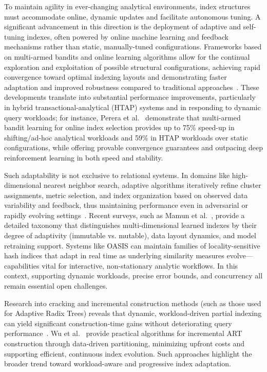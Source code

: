 \documentclass[sigconf]{acmart}
\begin{document}
To maintain agility in ever-changing analytical environments, index structures must accommodate online, dynamic updates and facilitate autonomous tuning. A significant advancement in this direction is the deployment of adaptive and self-tuning indexes, often powered by online machine learning and feedback mechanisms rather than static, manually-tuned configurations. Frameworks based on multi-armed bandits and online learning algorithms allow for the continual exploration and exploitation of possible structural configurations, achieving rapid convergence toward optimal indexing layouts and demonstrating faster adaptation and improved robustness compared to traditional approaches~\cite{ref79,ref80,ref105}. These developments translate into substantial performance improvements, particularly in hybrid transactional-analytical (HTAP) systems and in responding to dynamic query workloads; for instance, Perera et al.~\cite{ref105} demonstrate that multi-armed bandit learning for online index selection provides up to 75\% speed-up in shifting/ad-hoc analytical workloads and 59\% in HTAP workloads over static configurations, while offering provable convergence guarantees and outpacing deep reinforcement learning in both speed and stability.

Such adaptability is not exclusive to relational systems. In domains like high-dimensional nearest neighbor search, adaptive algorithms iteratively refine cluster assignments, metric selection, and index organization based on observed data variability and feedback, thus maintaining performance even in adversarial or rapidly evolving settings~\cite{ref110}. Recent surveys, such as Mamun et al.~\cite{ref110}, provide a detailed taxonomy that distinguishes multi-dimensional learned indexes by their degree of adaptivity (immutable vs. mutable), data layout dynamics, and model retraining support. Systems like OASIS can maintain families of locality-sensitive hash indices that adapt in real time as underlying similarity measures evolve---capabilities vital for interactive, non-stationary analytic workflows. In this context, supporting dynamic workloads, precise error bounds, and concurrency all remain essential open challenges.

Research into cracking and incremental construction methods (such as those used for Adaptive Radix Trees) reveals that dynamic, workload-driven partial indexing can yield significant construction-time gains without deteriorating query performance~\cite{ref109}. Wu et al.~\cite{ref109} provide practical algorithms for incremental ART construction through data-driven partitioning, minimizing upfront costs and supporting efficient, continuous index evolution. Such approaches highlight the broader trend toward workload-aware and progressive index adaptation.
\end{document}
